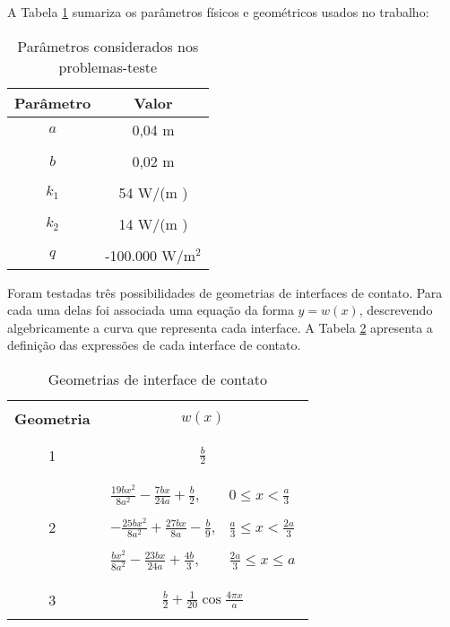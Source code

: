 A Tabela \ref{tabela_params} sumariza os parâmetros físicos e geométricos usados no trabalho:
\vspace{10mm}
\begin{table}[H]
	\centering
	\caption{Parâmetros considerados nos problemas-teste}
	\begin{tabular}{@{}cc@{}}
		\toprule
		\textbf{Parâmetro} & \textbf{Valor}    \\ \midrule
		$a$       & 0,04 m   \\ \\
		$b$       & 0,02 m     \\ \\
		$k_1$     & 54 W/(m \celsius)  \\ \\ 
		$k_2$     & 14 W/(m \celsius) \\ \\
		$q$       & -100.000 W/$\text{m}^2$ \\ \bottomrule
	\end{tabular}		
\label{tabela_params}
\end{table}

Foram testadas três possibilidades de geometrias de interfaces de contato. Para cada uma delas foi associada uma equação da forma $y = w(x)$, descrevendo algebricamente a curva que representa cada interface. A Tabela \ref{tabela_interfaces} apresenta a definição das expressões de cada interface de contato.
\begin{table}[H]
	\centering
	\caption{Geometrias de interface de contato}
		\begin{tabular}{c|c}
			\hline \\
			\textbf{Geometria} & $w(x)$    \\ \\ \hline \\
			1       & $\displaystyle\frac{b}{2}$   \\ \\ \hline \\
			2       & $\begin{array}{ll}
			\displaystyle\frac{19bx^2}{8a^2}-\frac{7bx}{24a}+\frac{b}{2}, & \displaystyle 0 \le x < \frac{a}{3} \\ \\
			\displaystyle -\frac{25bx^2}{8a^2}+\frac{27bx}{8a}-\frac{b}{9}, & \displaystyle \frac{a}{3} \le x < \frac{2a}{3} \\ \\
			\displaystyle \frac{bx^2}{8a^2}-\frac{23bx}{24a}+\frac{4b}{3}, & \displaystyle \frac{2a}{3} \le x \le a
			\end{array}$     \\ \\ \hline \\
			3       & $\displaystyle \frac{b}{2} + \frac{1}{20} \cos\frac{4 \pi  x}{a}$ \\ \\ \hline
		\end{tabular}			
	\label{tabela_interfaces}
\end{table}

